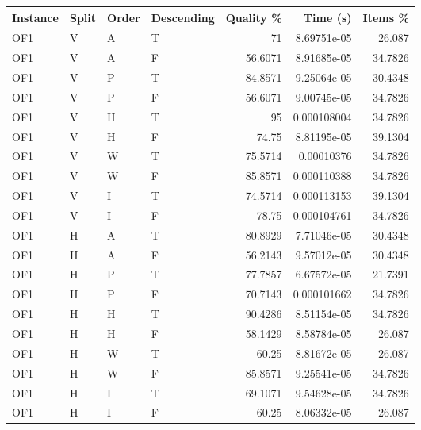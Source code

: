 \begin{tabular}{llllrrr}
    \hline
    Instance & Split & Order & Descending & Quality \% & Time (s)    & Items \% \\
    \hline
    OF1      & V     & A     & T          & 71         & 8.69751e-05 & 26.087   \\
    OF1      & V     & A     & F          & 56.6071    & 8.91685e-05 & 34.7826  \\
    OF1      & V     & P     & T          & 84.8571    & 9.25064e-05 & 30.4348  \\
    OF1      & V     & P     & F          & 56.6071    & 9.00745e-05 & 34.7826  \\
    OF1      & V     & H     & T          & 95         & 0.000108004 & 34.7826  \\
    OF1      & V     & H     & F          & 74.75      & 8.81195e-05 & 39.1304  \\
    OF1      & V     & W     & T          & 75.5714    & 0.00010376  & 34.7826  \\
    OF1      & V     & W     & F          & 85.8571    & 0.000110388 & 34.7826  \\
    OF1      & V     & I     & T          & 74.5714    & 0.000113153 & 39.1304  \\
    OF1      & V     & I     & F          & 78.75      & 0.000104761 & 34.7826  \\
    OF1      & H     & A     & T          & 80.8929    & 7.71046e-05 & 30.4348  \\
    OF1      & H     & A     & F          & 56.2143    & 9.57012e-05 & 30.4348  \\
    OF1      & H     & P     & T          & 77.7857    & 6.67572e-05 & 21.7391  \\
    OF1      & H     & P     & F          & 70.7143    & 0.000101662 & 34.7826  \\
    OF1      & H     & H     & T          & 90.4286    & 8.51154e-05 & 34.7826  \\
    OF1      & H     & H     & F          & 58.1429    & 8.58784e-05 & 26.087   \\
    OF1      & H     & W     & T          & 60.25      & 8.81672e-05 & 26.087   \\
    OF1      & H     & W     & F          & 85.8571    & 9.25541e-05 & 34.7826  \\
    OF1      & H     & I     & T          & 69.1071    & 9.54628e-05 & 34.7826  \\
    OF1      & H     & I     & F          & 60.25      & 8.06332e-05 & 26.087   \\

\end{tabular}
